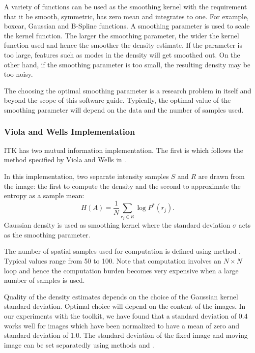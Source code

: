 A variety of functions can be used as the smoothing kernel with the
requirement that it be smooth, symmetric, has zero mean and
integrates to one. For example, boxcar, Gaussian and B-Spline functions.
A smoothing parameter is used to scale the kernel function.
The larger the smoothing parameter, the wider the kernel function
used and hence the smoother the density estimate. If the parameter is
too large, features such as modes in the density will get smoothed out.
On the other hand, if the smoothing parameter is too small, the
resulting density may be too noisy.

The choosing the optimal smoothing parameter is a research 
problem in itself and beyond the scope of this software guide.
Typically, the optimal value of the smoothing parameter will 
depend on the data and the number of samples used.

\subsubsection{Viola and Wells Implementation}
ITK has two mutual information implementation. The first is 
 which follows the method specified
by Viola and Wells in \cite{ViolaW:1997}.


In this implementation, two separate intensity samples $S$ and $R$ are drawn
from the image: the first to compute the density and the second to approximate
the entropy as a sample mean:
\begin{equation}
H(A) = \frac{1}{N} \sum_{r_j \in R} \log P^{*}(r_j).
\end{equation}
Gaussian density is used as smoothing kernel where the standard deviation
$\sigma$ acts as the smoothing parameter.


The number of spatial samples used for computation is defined using
method . Typical values range from 50 to 100.
Note that computation involves an $N \times N$ loop and hence the computation
burden becomes very expensive when a large number of samples is used.

Quality of the density estimates depends on the choice of the Gaussian kernel
standard deviation. Optimal choice will depend on the content of the images.
In our experiments with the toolkit, we have found that a standard deviation
of 0.4 works well for images which have been normalized to have a mean
of zero and standard deviation of 1.0. The standard deviation of the fixed image
and moving image can be set separatedly using methods 
 and .

